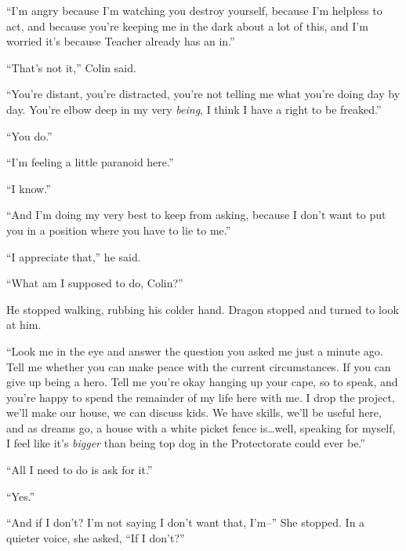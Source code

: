 ``I'm angry because I'm watching you destroy yourself, because I'm helpless to act, and because you're keeping me in the dark about a lot of this, and I'm worried it's because Teacher already has an in.''



``That's not it,'' Colin said.



``You're distant, you're distracted, you're not telling me what you're doing day by day.  You're elbow deep in my very \emph{being}, I think I have a right to be freaked.''



``You do.''



``I'm feeling a little paranoid here.''



``I know.''



``And I'm doing my very best to keep from asking, because I don't want to put you in a position where you have to lie to me.''



``I appreciate that,'' he said.



``What am I supposed to do, Colin?''



He stopped walking, rubbing his colder hand.  Dragon stopped and turned to look at him.



``Look me in the eye and answer the question you asked me just a minute ago.  Tell me whether you can make peace with the current circumstances.  If you can give up being a hero.  Tell me you're okay hanging up your cape, so to speak, and you're happy to spend the remainder of my life here with me.  I drop the project, we'll make our house, we can discuss kids.  We have skills, we'll be useful here, and as dreams go, a house with a white picket fence is\ldots well, speaking for myself, I feel like it's \emph{bigger} than being top dog in the Protectorate could ever be.''



``All I need to do is ask for it.''



``Yes.''



``And if I don't?  I'm not saying I don't want that, I'm--'' She stopped.  In a quieter voice, she asked, ``If I don't?''



